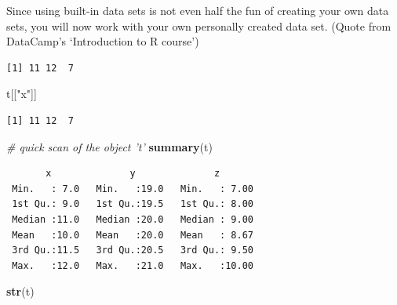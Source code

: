 \documentclass[
]{book}
\newenvironment{Shaded}{\begin{snugshade}}{\end{snugshade}}
\newcommand{\CommentTok}[1]{\textcolor[rgb]{0.56,0.35,0.01}{\textit{#1}}}
\newcommand{\DataTypeTok}[1]{\textcolor[rgb]{0.13,0.29,0.53}{#1}}
\newcommand{\DecValTok}[1]{\textcolor[rgb]{0.00,0.00,0.81}{#1}}
\newcommand{\KeywordTok}[1]{\textcolor[rgb]{0.13,0.29,0.53}{\textbf{#1}}}
\newcommand{\NormalTok}[1]{#1}
\newcommand{\OperatorTok}[1]{\textcolor[rgb]{0.81,0.36,0.00}{\textbf{#1}}}
\newcommand{\StringTok}[1]{\textcolor[rgb]{0.31,0.60,0.02}{#1}}
\begin{document}
Since using built-in data sets is not even half the fun of creating your own data sets, you will now work with your own personally created data set. (Quote from DataCamp's `Introduction to R course')

\begin{Shaded}
\end{Shaded}

\begin{verbatim}
[1] 11 12  7
\end{verbatim}

\begin{Shaded}
\begin{Highlighting}[]
\NormalTok{t[[}\StringTok{"x"}\NormalTok{]]}
\end{Highlighting}
\end{Shaded}

\begin{verbatim}
[1] 11 12  7
\end{verbatim}

\begin{Shaded}
\begin{Highlighting}[]
\CommentTok{# quick scan of the object 't'}
\KeywordTok{summary}\NormalTok{(t)}
\end{Highlighting}
\end{Shaded}

\begin{verbatim}
       x              y              z        
 Min.   : 7.0   Min.   :19.0   Min.   : 7.00  
 1st Qu.: 9.0   1st Qu.:19.5   1st Qu.: 8.00  
 Median :11.0   Median :20.0   Median : 9.00  
 Mean   :10.0   Mean   :20.0   Mean   : 8.67  
 3rd Qu.:11.5   3rd Qu.:20.5   3rd Qu.: 9.50  
 Max.   :12.0   Max.   :21.0   Max.   :10.00  
\end{verbatim}

\begin{Shaded}
\begin{Highlighting}[]
\KeywordTok{str}\NormalTok{(t)}
\end{Highlighting}
\end{Shaded}
\end{document}

